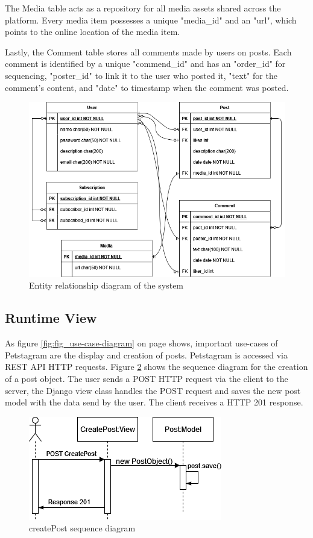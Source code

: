 \documentclass[lettersize,journal]{IEEEtran}
\begin{document}
The Media table acts as a repository for all media assets shared across the platform. Every media item possesses a unique "media\_id" and an "url", which points to the online location of the media item. 

Lastly, the Comment table stores all comments made by users on posts. Each comment is identified by a unique "commend\_id" and has an "order\_id" for sequencing, "poster\_id" to link it to the user who posted it, "text" for the comment's content, and "date" to timestamp when the comment was posted.





\begin{figure}[!t]
    \centering
    \includegraphics[width=3.5 in]{diagrams/ERD}
    \caption{Entity relationship diagram of the system}
    \label{fig:ERD}
\end{figure}

\noindent

\subsection{Runtime View}
\noindent
As figure \ref{fig:fig_use-case-diagram} on page \pageref{fig:fig_use-case-diagram} shows, important use-cases of Petstagram are the display and creation of posts. Petstagram is accessed via REST API HTTP requests. Figure \ref{fig:createPost} shows the sequence diagram for the creation of a post object. The user sends a POST HTTP request via the client to the server, the Django view class handles the POST request and saves the new post model with the data send by the user. The client receives a HTTP 201 response. 
\begin{figure}[!t]
    \centering
    \includegraphics[width=3.5 in]{diagrams/createPost_sequence.drawio.png}
    \caption{createPost sequence diagram}
    \label{fig:createPost}
\end{figure}
\end{document}
